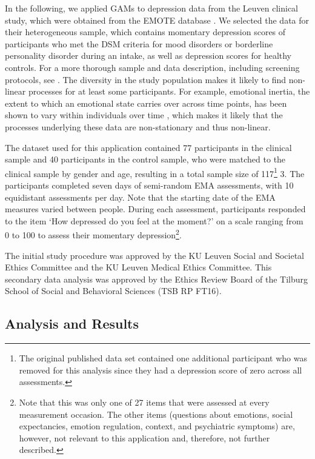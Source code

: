 \documentclass[man, floatsintext]{apa7}
\begin{document}
In the following, we applied GAMs to depression data from the Leuven clinical
study, which were obtained from the EMOTE database
\parencite{kalokerinos_emote_nodate}. We selected the data for their
heterogeneous sample, which contains momentary depression scores of
participants who met the DSM criteria for mood disorders or borderline
personality disorder during an intake, as well as depression scores for healthy
controls. For a more thorough sample and data description, including screening
protocols, see \textcite{heininga_dynamical_2019}. The diversity in the study
population makes it likely to find non-linear processes for at least some
participants. For example, emotional inertia, the extent to which an emotional
state carries over across time points, has been shown to vary within
individuals over time \parencite{koval_changing_2012}, which makes it likely
that the processes underlying these data are non-stationary and thus
non-linear.

The dataset used for this application contained 77 participants in the clinical
sample and 40 participants in the control sample, who were matched to the
clinical sample by gender and age, resulting in a total sample size of
117\footnote{The original published data set contained one additional
  participant who was removed for this analysis since they had a depression
  score
  of zero across all assessments.} 3. The participants completed seven days of
semi-random EMA assessments, with 10 equidistant assessments per day. Note that
the starting date of the EMA measures varied between people.  During each
assessment, participants responded to the item `How depressed do you feel at
the moment?' on a scale ranging from 0 to 100 to assess their momentary
depression\footnote{Note that this was only one of 27 items that were assessed
  at every measurement occasion. The other items (questions about emotions,
  social expectancies, emotion regulation, context, and psychiatric symptoms)
  are, however, not relevant to this application and, therefore, not further
  described.}.

The initial study procedure was approved by the KU Leuven Social and Societal
Ethics Committee and the KU Leuven Medical Ethics Committee. This secondary
data analysis was approved by the Ethics Review Board of the Tilburg School
of Social and Behavioral Sciences (TSB RP FT16).

\subsection{Analysis and Results}
\end{document}
